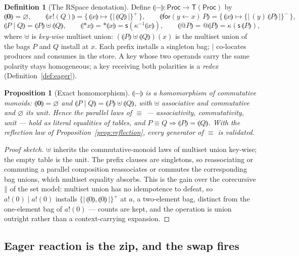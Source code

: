 \documentclass[11pt]{article}
\makeatletter
\newcommand{\swp}{\mathsf{s}}                  %
\newcommand{\kt}{\kappa}                       %
\newcommand{\Zero}{\mathbf{0}}
\newcommand{\Par}{\mathbin{\mid}}
\newcommand{\inp}[3]{\mathsf{for}(#1 \leftarrow #2)\,#3}
\newcommand{\out}[2]{#1\mathbin{!}(#2)}
\newcommand{\drp}[1]{{\ast}#1}
\newcommand{\quo}[1]{@#1}
\newcommand{\abs}[2]{(#1)\,#2}                  %
\newcommand{\Proc}{\mathsf{Proc}}
\newcommand{\sem}[1]{\llparenthesis #1\rrparenthesis}   %
\newcommand{\scong}{\equiv}
\newcommand{\rpar}{\mathbin{\|}}               %
\newcommand{\Tab}{\mathsf{T}}                  %
\newcommand{\bag}[1]{\{\!|\,#1\,|\!\}}         %
\newcommand{\uplusk}{\mathbin{\uplus}}         %
\theoremstyle{plain}
\newtheorem{proposition}[theorem]{Proposition}
\theoremstyle{definition}
\newtheorem{definition}[theorem]{Definition}
\makeatother
\begin{document}
\begin{definition}[The RSpace denotation]\label{def:rspace}
Define $\sem{-}\colon\Proc\to\Tab(\Proc)$ by
\[
  \sem{\Zero}=\varnothing,\qquad
  \sem{\out x Q}=\big\{\,\sem{x}\mapsto\bag{\sem Q}^{+}\,\big\},\qquad
  \sem{\inp y x P}=\big\{\,\sem{x}\mapsto\bag{\abs y{\sem P}}^{-}\,\big\},
\]
\[
  \sem{P\Par Q}=\sem P \uplusk \sem Q,\qquad
  \sem{\drp x}=\drp{\sem x}=\swp(\kt^{-1}\sem x),\qquad
  \sem{\quo P}=\quo{\sem P}=\kt(\swp\,\sem P),
\]
where $\uplusk$ is \emph{key-wise} multiset union: $(\sem P\uplusk\sem Q)(x)$ is the
multiset union of the bags $P$ and $Q$ install at $x$. Each prefix installs a
singleton bag; $\Par$ co-locates produces and consumes in the store. A key whose
two operands carry the same polarity stays homogeneous; a key receiving both
polarities is a \emph{redex} (Definition~\ref{def:eager}).
\end{definition}

\begin{proposition}[Exact homomorphism]\label{prop:hom}
$\sem{-}$ is a homomorphism of commutative monoids: $\sem\Zero=\varnothing$ and
$\sem{P\Par Q}=\sem P\uplusk\sem Q$, with $\uplusk$ associative and commutative and
$\varnothing$ its unit. Hence the parallel laws of $\scong$ ---
associativity, commutativity, unit --- hold as literal equalities of tables, and
$P\scong Q\Rightarrow\sem P=\sem Q$. With the reflection law of
Proposition~\ref{prop:reflection}, every generator of $\scong$ is validated.
\end{proposition}
\begin{proof}[Proof sketch]
$\uplusk$ inherits the commutative-monoid laws of multiset union key-wise; the empty
table is the unit. The prefix clauses are singletons, so reassociating or
commuting a parallel composition reassociates or commutes the corresponding bag
unions, which multiset equality absorbs. This is the gain over the corecursive
$\rpar$ of the set model: multiset union has no idempotence to defeat, so
$\out a 0\Par\out a 0$ installs $\bag{\sem{0},\sem{0}}^{+}$ at $a$, a two-element
bag, distinct from the one-element bag of $\out a 0$ --- counts are kept, and the
operation is union outright rather than a context-carrying expansion.
\end{proof}

\subsection{Eager reaction is the zip, and the swap fires}
\end{document}
